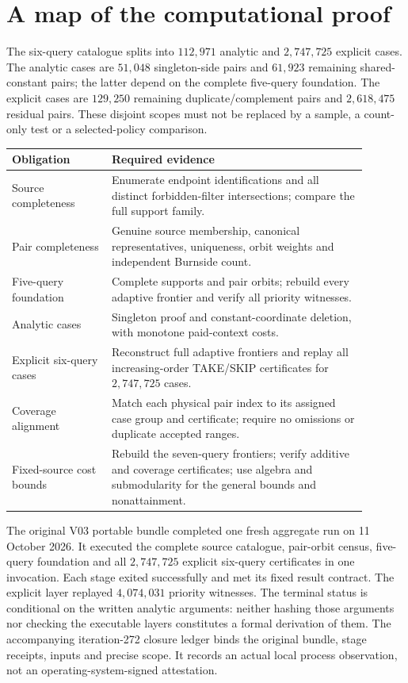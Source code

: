 \documentclass[pdflatex,sn-mathphys-num]{sn-jnl}
\theoremstyle{thmstyleone}
\theoremstyle{thmstylethree}
\theoremstyle{thmstyletwo}
\begin{document}
\section{A map of the computational proof}\label{app:reproduction}
The six-query catalogue splits into $112,971$ analytic and $2,747,725$ explicit cases. The analytic cases are $51,048$ singleton-side pairs and $61,923$ remaining shared-constant pairs; the latter depend on the complete five-query foundation. The explicit cases are $129,250$ remaining duplicate/complement pairs and $2,618,475$ residual pairs. These disjoint scopes must not be replaced by a sample, a count-only test or a selected-policy comparison.

\begin{center}\small
\begin{tabular}{@{}p{0.25\linewidth}p{0.64\linewidth}@{}}\toprule
Obligation & Required evidence\\\midrule
Source completeness & Enumerate endpoint identifications and all distinct forbidden-filter intersections; compare the full support family.\\
Pair completeness & Genuine source membership, canonical representatives, uniqueness, orbit weights and independent Burnside count.\\
Five-query foundation & Complete supports and pair orbits; rebuild every adaptive frontier and verify all priority witnesses.\\
Analytic cases & Singleton proof and constant-coordinate deletion, with monotone paid-context costs.\\
Explicit six-query cases & Reconstruct full adaptive frontiers and replay all increasing-order TAKE/SKIP certificates for $2,747,725$ cases.\\
Coverage alignment & Match each physical pair index to its assigned case group and certificate; require no omissions or duplicate accepted ranges.\\
Fixed-source cost bounds & Rebuild the seven-query frontiers; verify additive and coverage certificates; use algebra and submodularity for the general bounds and nonattainment.\\\bottomrule
\end{tabular}
\end{center}

The original V03 portable bundle completed one fresh aggregate run on 11 October 2026. It executed the complete source catalogue, pair-orbit census, five-query foundation and all $2,747,725$ explicit six-query certificates in one invocation. Each stage exited successfully and met its fixed result contract. The explicit layer replayed $4,074,031$ priority witnesses. The terminal status is conditional on the written analytic arguments: neither hashing those arguments nor checking the executable layers constitutes a formal derivation of them. The accompanying iteration-272 closure ledger binds the original bundle, stage receipts, inputs and precise scope. It records an actual local process observation, not an operating-system-signed attestation.
\end{document}
